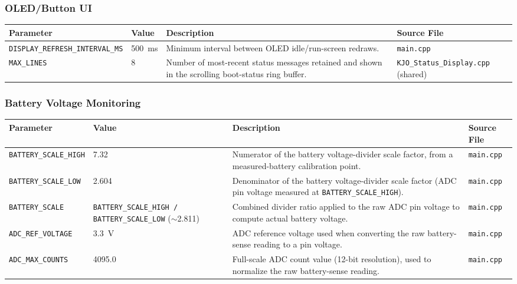 ﻿\documentclass[11pt,letterpaper]{article}
\begin{document}
\subsubsection*{OLED/Button UI}

\begingroup
\footnotesize
\begin{longtable}{@{}p{3.2cm}p{2.4cm}p{6.2cm}p{2.6cm}@{}}
\toprule
Parameter & Value & Description & Source File \\
\midrule
\texttt{DISPLAY\_\allowbreak REFRESH\_\allowbreak INTERVAL\_\allowbreak MS} & 500~ms & Minimum interval between OLED idle/run-screen redraws. & \texttt{main.cpp} \\
\texttt{MAX\_\allowbreak LINES} & 8 & Number of most-recent status messages retained and shown in the scrolling boot-status ring buffer. & \texttt{KJO\_\allowbreak Status\_\allowbreak Display.cpp} (shared) \\
\end{longtable}
\endgroup

\subsubsection*{Battery Voltage Monitoring}

\begingroup
\footnotesize
\begin{longtable}{@{}p{3.2cm}p{2.4cm}p{6.2cm}p{2.6cm}@{}}
\toprule
Parameter & Value & Description & Source File \\
\midrule
\texttt{BATTERY\_\allowbreak SCALE\_\allowbreak HIGH} & 7.32 & Numerator of the battery voltage-divider scale factor, from a measured-battery calibration point. & \texttt{main.cpp} \\
\texttt{BATTERY\_\allowbreak SCALE\_\allowbreak LOW} & 2.604 & Denominator of the battery voltage-divider scale factor (ADC pin voltage measured at \texttt{BATTERY\_\allowbreak SCALE\_\allowbreak HIGH}). & \texttt{main.cpp} \\
\texttt{BATTERY\_\allowbreak SCALE} & \texttt{BATTERY\_\allowbreak SCALE\_\allowbreak HIGH / BATTERY\_\allowbreak SCALE\_\allowbreak LOW} ($\sim$2.811) & Combined divider ratio applied to the raw ADC pin voltage to compute actual battery voltage. & \texttt{main.cpp} \\
\texttt{ADC\_\allowbreak REF\_\allowbreak VOLTAGE} & 3.3~V & ADC reference voltage used when converting the raw battery-sense reading to a pin voltage. & \texttt{main.cpp} \\
\texttt{ADC\_\allowbreak MAX\_\allowbreak COUNTS} & 4095.0 & Full-scale ADC count value (12-bit resolution), used to normalize the raw battery-sense reading. & \texttt{main.cpp} \\
\end{longtable}
\endgroup
\end{document}
